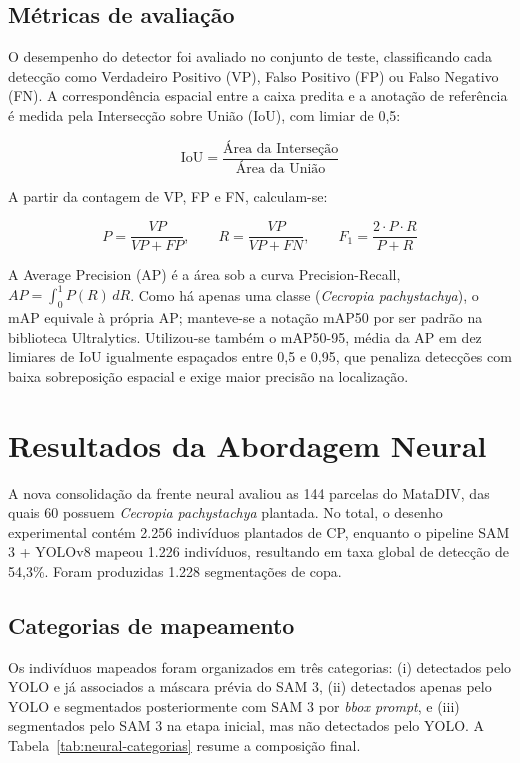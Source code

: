 \documentclass[12pt, a4paper]{article}
\begin{document}
\subsection{Métricas de avaliação}

O desempenho do detector foi avaliado no conjunto de teste, classificando cada
detecção como Verdadeiro Positivo (VP), Falso Positivo (FP) ou Falso Negativo (FN).
A correspondência espacial entre a caixa predita e a anotação de referência é
medida pela Intersecção sobre União (IoU), com limiar de 0,5:

\begin{equation}
    \text{IoU} = \frac{\text{Área da Interseção}}{\text{Área da União}}
\end{equation}

A partir da contagem de VP, FP e FN, calculam-se:

\begin{equation}
    P = \frac{VP}{VP + FP}, \qquad
    R = \frac{VP}{VP + FN}, \qquad
    F_1 = \frac{2 \cdot P \cdot R}{P + R}
\end{equation}

A Average Precision (AP) é a área sob a curva Precision-Recall,
$AP = \int_{0}^{1} P(R)\, dR$. Como há apenas uma classe
(\textit{Cecropia pachystachya}), o mAP equivale à própria AP; manteve-se a
notação mAP50 por ser padrão na biblioteca Ultralytics. Utilizou-se também o
mAP50-95, média da AP em dez limiares de IoU igualmente espaçados entre 0,5 e 0,95,
que penaliza detecções com baixa sobreposição espacial e exige maior precisão na
localização.

\section{Resultados da Abordagem Neural}

A nova consolidação da frente neural avaliou as 144 parcelas do MataDIV, das quais
60 possuem \textit{Cecropia pachystachya} plantada. No total, o desenho
experimental contém 2.256 indivíduos plantados de CP, enquanto o pipeline SAM 3 +
YOLOv8 mapeou 1.226 indivíduos, resultando em taxa global de detecção de 54,3\%.
Foram produzidas 1.228 segmentações de copa.

\subsection{Categorias de mapeamento}

Os indivíduos mapeados foram organizados em três categorias: (i) detectados pelo
YOLO e já associados a máscara prévia do SAM 3, (ii) detectados apenas pelo YOLO e
segmentados posteriormente com SAM 3 por \textit{bbox prompt}, e (iii)
segmentados pelo SAM 3 na etapa inicial, mas não detectados pelo YOLO. A
Tabela~\ref{tab:neural-categorias} resume a composição final.
\end{document}
